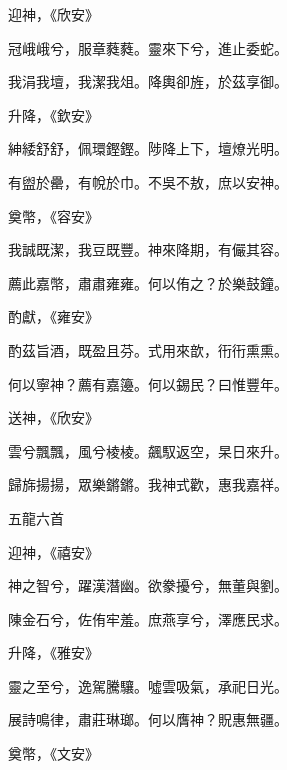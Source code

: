 \begin{pinyinscope}
 迎神，《欣安》



 冠峨峨兮，服章蕤蕤。靈來下兮，進止委蛇。



 我涓我壇，我潔我俎。降輿卻旌，於茲享御。



 升降，《欽安》



 紳緌舒舒，佩環鏗鏗。陟降上下，壇燎光明。



 有盥於罍，有帨於巾。不吳不敖，庶以安神。



 奠幣，《容安》



 我誠既潔，我豆既豐。神來降期，有儼其容。



 薦此嘉幣，肅肅雍雍。何以侑之？於樂鼓鐘。



 酌獻，《雍安》



 酌茲旨酒，既盈且芬。式用來歆，衎衎熏熏。



 何以寧神？薦有嘉籩。何以錫民？曰惟豐年。



 送神，《欣安》



 雲兮飄飄，風兮棱棱。飆馭返空，杲日來升。



 歸旆揚揚，眾樂鏘鏘。我神式歡，惠我嘉祥。



 五龍六首



 迎神，《禧安》



 神之智兮，躍漢潛幽。欲豢擾兮，無董與劉。



 陳金石兮，佐侑牢羞。庶燕享兮，澤應民求。



 升降，《雅安》



 靈之至兮，逸駕騰驤。噓雲吸氣，承祀日光。



 展詩鳴律，肅莊琳瑯。何以膺神？貺惠無疆。



 奠幣，《文安》




\end{pinyinscope}
